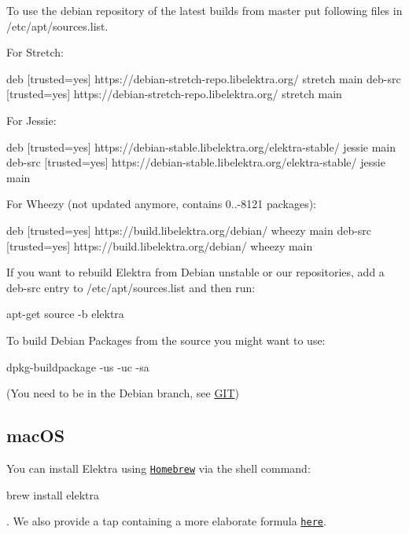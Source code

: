 To use the debian repository of the latest builds from master put following files in {\ttfamily /etc/apt/sources.list}.

For Stretch\+: \begin{DoxyVerb}    deb     [trusted=yes] https://debian-stretch-repo.libelektra.org/ stretch main
    deb-src [trusted=yes] https://debian-stretch-repo.libelektra.org/ stretch main
\end{DoxyVerb}


For Jessie\+: \begin{DoxyVerb}    deb     [trusted=yes] https://debian-stable.libelektra.org/elektra-stable/ jessie main
    deb-src [trusted=yes] https://debian-stable.libelektra.org/elektra-stable/ jessie main
\end{DoxyVerb}


For Wheezy (not updated anymore, contains 0..-\/8121 packages)\+: \begin{DoxyVerb}    deb     [trusted=yes] https://build.libelektra.org/debian/ wheezy main
    deb-src [trusted=yes] https://build.libelektra.org/debian/ wheezy main
\end{DoxyVerb}


If you want to rebuild Elektra from Debian unstable or our repositories, add a {\ttfamily deb-\/src} entry to {\ttfamily /etc/apt/sources.list} and then run\+: \begin{DoxyVerb}    apt-get source -b elektra
\end{DoxyVerb}


To build Debian Packages from the source you might want to use\+: \begin{DoxyVerb}    dpkg-buildpackage -us -uc -sa
\end{DoxyVerb}


(You need to be in the Debian branch, see \hyperlink{doc_GIT_md}{G\+IT})

\subsection*{mac\+OS}

You can install Elektra using \href{http://brew.sh}{\tt Homebrew} via the shell command\+:


\begin{DoxyCode}
brew install elektra
\end{DoxyCode}


. We also provide a tap containing a more elaborate formula \href{http://github.com/ElektraInitiative/homebrew-elektra}{\tt here}.

